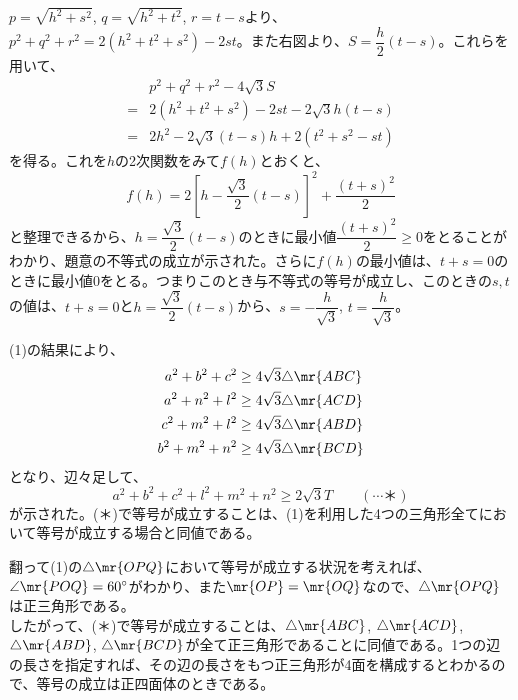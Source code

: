 $p=\sqrt{h^2+s^2}$, $q=\sqrt{h^2+t^2}$, $r=t-s$より、$p^2+q^2+r^2=2(h^2+t^2+s^2)-2st$。また右図より、$S=\dfrac{h}{2}(t-s)$。これらを用いて、
\begin{align*}
 &p^2+q^2+r^2-4\sqrt{3}S \\
 =&2(h^2+t^2+s^2)-2st-2\sqrt{3}h(t-s) \\
 =&2h^2-2\sqrt{3}(t-s)h+2(t^2+s^2-st)
\end{align*}
を得る。これを$h$の2次関数をみて$f(h)$とおくと、
\[ f(h)=2\left[h-\frac{\sqrt{3}}{2}(t-s)\right]^2+\frac{(t+s)^2}{2} \]
と整理できるから、$h=\dfrac{\sqrt{3}}{2}(t-s)$のときに最小値$\dfrac{(t+s)^2}{2}\ge 0$をとることがわかり、題意の不等式の成立が示された。さらに$f(h)$の最小値は、$t+s=0$のときに最小値0をとる。つまりこのとき与不等式の等号が成立し、このときの$s, t$の値は、$t+s=0$と$h=\dfrac{\sqrt{3}}{2}(t-s)$から、$s=-\dfrac{h}{\sqrt{3}}$, $t=\dfrac{h}{\sqrt{3}}$。

(1)の結果により、
\begin{align*}
 a^2+b^2+c^2&\ge 4\sqrt{3}\triangle\mr{ABC} \\
 a^2+n^2+l^2&\ge 4\sqrt{3}\triangle\mr{ACD} \\
 c^2+m^2+l^2&\ge 4\sqrt{3}\triangle\mr{ABD} \\
 b^2+m^2+n^2&\ge 4\sqrt{3}\triangle\mr{BCD} \\
\end{align*}
となり、辺々足して、
\[ a^2+b^2+c^2+l^2+m^2+n^2 \ge 2\sqrt{3}T \qquad (\cdots \text{＊}) \]
が示された。(＊)で等号が成立することは、(1)を利用した4つの三角形全てにおいて等号が成立する場合と同値である。

翻って(1)の$\triangle\mr{OPQ}$において等号が成立する状況を考えれば、$\angle\mr{POQ}=60^\circ$がわかり、また$\mr{OP}=\mr{OQ}$なので、$\triangle\mr{OPQ}$は正三角形である。\\
したがって、(＊)で等号が成立することは、$\triangle\mr{ABC}$, $\triangle\mr{ACD}$, $\triangle\mr{ABD}$, $\triangle\mr{BCD}$が全て正三角形であることに同値である。1つの辺の長さを指定すれば、その辺の長さをもつ正三角形が4面を構成するとわかるので、等号の成立は正四面体のときである。